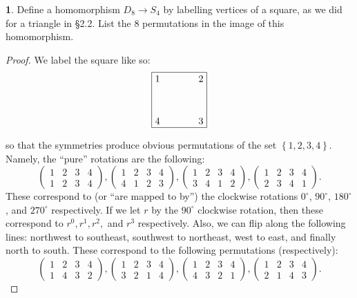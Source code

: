 \documentclass{article}
\theoremstyle{definition}
\newtheorem{ex}{}[section]
\begin{document}
\begin{ex}
	Define a homomorphism $D_8 \to S_4$ by labelling vertices of a square, as we did for a triangle in \S 2.2.
	List the 8 permutations in the image of this homomorphism.
\end{ex}
\begin{proof}
	We label the square like so: \begin{equation*}
		\begin{tikzpicture}[scale=2]
			\draw (0, 0) rectangle (1, 1);
			\draw (0, 0) node[anchor=south west]{4};
			\draw (1, 0) node[anchor=south east]{3};
			\draw (1, 1) node[anchor=north east]{2};
			\draw (0, 1) node[anchor=north west]{1};
		\end{tikzpicture}
	\end{equation*}
	so that the symmetries produce obvious permutations of the set $\left\lbrace 1, 2, 3, 4 \right\rbrace$.
	Namely, the ``pure'' rotations are the following: \begin{equation*}
		\begin{pmatrix*}
			1 & 2 & 3 & 4 \\
			1 & 2 & 3 & 4
		\end{pmatrix*},
		\begin{pmatrix*}
			1 & 2 & 3 & 4 \\
			4 & 1 & 2 & 3
		\end{pmatrix*},
		\begin{pmatrix*}
			1 & 2 & 3 & 4 \\
			3 & 4 & 1 & 2
		\end{pmatrix*},
		\begin{pmatrix*}
			1 & 2 & 3 & 4 \\
			2 & 3 & 4 & 1
		\end{pmatrix*}.
	\end{equation*}
	These correspond to (or ``are mapped to by'') the clockwise rotations $0^\circ$, $90^\circ$, $180^\circ$, and $270^\circ$ respectively.
	If we let $r$ by the $90^\circ$ clockwise rotation, then these correspond to $r^0, r^1, r^2,$ and $r^3$ respectively.
	Also, we can flip along the following lines: northwest to southeast, southwest to northeast, west to east, and finally north to south.
	These correspond to the following permutations (respectively): \begin{equation*}
		\begin{pmatrix*}
			1 & 2 & 3 & 4 \\
			1 & 4 & 3 & 2
		\end{pmatrix*},
		\begin{pmatrix*}
			1 & 2 & 3 & 4 \\
			3 & 2 & 1 & 4
		\end{pmatrix*},
		\begin{pmatrix*}
			1 & 2 & 3 & 4 \\
			4 & 3 & 2 & 1
		\end{pmatrix*},
		\begin{pmatrix*}
			1 & 2 & 3 & 4 \\
			2 & 1 & 4 & 3
		\end{pmatrix*}.
	\end{equation*}
\end{proof}
\end{document}
